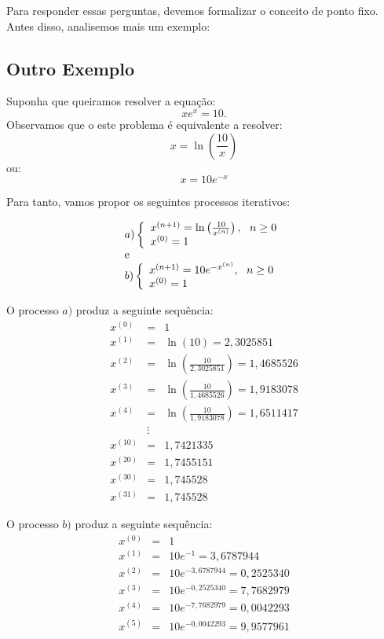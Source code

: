 Para responder essas perguntas, devemos formalizar o conceito de ponto fixo. Antes disso, analisemos mais um exemplo:

\subsection{Outro Exemplo}

Suponha que queiramos resolver a equação:
$$xe^x=10.$$
Observamos que o este problema é equivalente a resolver:
\begin{equation*}
x=\ln\left(\frac{10}{x}\right)  
\end{equation*}
ou:
\begin{equation*}
x=10e^{-x}
\end{equation*}

Para tanto, vamos propor os seguintes processos iterativos:

$$\begin{array}{l}
a)\left\{\begin{array}{ll}x^{(n+1)}=\ln\left(\frac{10}{x^{(n)}}\right),~~ n\geq 0\\
x^{(0)}=1
\end{array}\right.\\ \hbox{e} \\
b)\left\{\begin{array}{ll}x^{(n+1)}={10}{e^{-x^{(n)}}},~~ n\geq 0\\
x^{(0)}=1
\end{array}\right.\end{array}$$

O processo $a)$ produz a seguinte sequência:
\begin{eqnarray*}
x^{(0)}&=&1\\
x^{(1)}&=&\ln\left({10}\right)=2,3025851\\
x^{(2)}&=&\ln\left(\frac{10}{2,3025851}\right)=1,4685526\\
x^{(3)}&=&\ln\left(\frac{10}{1,4685526}\right)=1,9183078 \\
x^{(4)}&=&\ln\left(\frac{10}{1,9183078}\right)=1,6511417  \\
&\vdots&\\
x^{(10)}&=&1,7421335 \\
x^{(20)}&=& 1,7455151\\
x^{(30)}&=& 1,745528\\
x^{(31)}&=& 1,745528
\end{eqnarray*}

O processo $b)$ produz a seguinte sequência:
\begin{eqnarray*}
x^{(0)}&=&1\\
x^{(1)}&=&10e^{-1}= 3,6787944   \\
x^{(2)}&=&10e^{- 3,6787944 }= 0,2525340     \\
x^{(3)}&=&10e^{-0,2525340}=  7,7682979      \\
x^{(4)}&=&10e^{-7,7682979}=  0,0042293      \\
x^{(5)}&=&10e^{-0,0042293}=  9,9577961
\end{eqnarray*}


